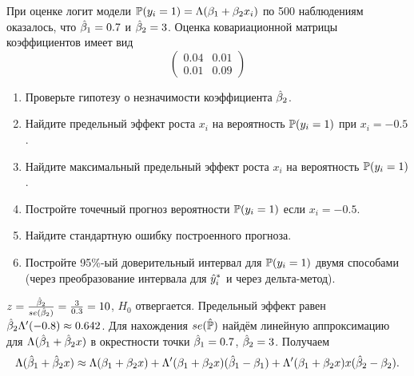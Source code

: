 \begin{problem}
При оценке логит модели
\(
\P(y_i=1)=\Lambda(\b_1+\b_2 x_i)
\)
по 500 наблюдениям оказалось, что $\hb_1=0.7$ и $\hb_2=3$. Оценка ковариационной матрицы коэффициентов имеет вид
\[
\begin{pmatrix}
  0.04 & 0.01 \\
  0.01 & 0.09
\end{pmatrix}
\]

\begin{enumerate}
\item Проверьте гипотезу о незначимости коэффициента $\hb_2$.
\item Найдите предельный эффект роста $x_i$ на вероятность $\P(y_i=1)$ при $x_i=-0.5$.
\item Найдите максимальный предельный эффект роста $x_i$ на вероятность $\P(y_i=1)$.
\item Постройте точечный прогноз вероятности $\P(y_i=1)$ если $x_i = -0.5$.
\item Найдите стандартную ошибку построенного прогноза.
\item Постройте 95\%-ый доверительный интервал для $\P(y_i=1)$ двумя способами (через преобразование интервала для $\hy_i^*$ и через дельта-метод).
\end{enumerate}
\begin{sol}
$z = \frac{\hb_2}{se(\hb_2)}=\frac{3}{0.3}=10$, $H_0$ отвергается.
Предельный эффект равен $\hb_2 \Lambda'(-0.8)\approx 0.642$.
Для нахождения $se(\hat\P)$ найдём линейную аппроксимацию для $\Lambda(\hb_1 + \hb_2 x)$ в окрестности точки $\hb_1=0.7$, $\hb_2=3$. Получаем
\[
\Lambda(\hb_1 + \hb_2 x) \approx \Lambda(\beta_1 + \beta_2 x) + \Lambda'(\beta_1 + \beta_2 x) (\hb_1 - \beta_1) + \Lambda'(\beta_1 + \beta_2 x)x(\hb_2 - \beta_2).
\]
\end{sol}
\end{problem}



